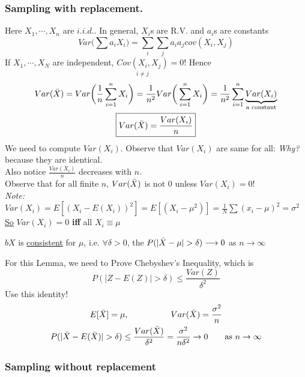 \subsubsection*{Sampling with replacement.}
Here $X_1, \cdots, X_n$ are $i.i.d.$. In general, $X_i$s are R.V. and $a_i$s are constants
\begin{equation*}
	Var\big(\sum a_i X_i\big) = \sum\limits_i \sum\limits_j a_i a_j cov(X_i, X_j) 
\end{equation*}
If $X_1, \cdots, X_N$ are independent, $\underset{i \neq j}{Cov(X_i, X_j)} = 0$! Hence
\begin{gather*}
	Var(\bar{X}) = Var\bigg(\frac{1}{n} \sum\limits_{i=1}^n X_i \bigg) = \frac{1}{n^2} Var\bigg( \sum\limits_{i=1}^n X_i \bigg) = \frac{1}{n^2}  \sum\limits_{i=1}^n \underbrace{Var(X_i)}_{\text{a constant}}\\
	\boxed{Var(\bar{X}) = \frac{Var(X_i)}{n}}
\end{gather*}
We need to compute $Var(X_i)$. Observe that $Var(X_i)$ are same for all: \textit{Why?} because they are identical.\\
Also notice $\frac{Var(X_i)}{n}$ decreases with $n$.\\
Observe that for all finite $n$, $Var(\bar{X})$ is not 0 unless $Var(X_i) = 0$!\\
\emph{Note:} $Var(X_i) = E[(X_i - E(X_i))^2] = E[(X_i - \mu^2)] = \frac{1}{N} \sum (x_i - \mu)^2 = \sigma^2$\\
\underline{So} $Var(X_i) = 0$ \textbf{iff} all $X_i \equiv \mu$
\begin{lemma}
	$bX$ is \underline{consistent} for $\mu$, i.e. $\forall \delta > 0$, the $P(|\bar{X} - \mu| > \delta) \longrightarrow 0$ as $n\rightarrow \infty$
\end{lemma}
For this Lemma, we need to Prove Chebyshev's Inequality, which is
\begin{equation*}
	P(|Z - E(Z)| > \delta) \leq \frac{Var(Z)}{\delta^2}
\end{equation*}
Use this identity!
\begin{gather*}
	E[\bar{X}] = \mu, \hspace{5em} Var(\bar{X}) = \frac{\sigma^2}{n}\\
	P(|\bar{X} - E(\bar{X})| > \delta) \leq \frac{Var(\bar{X})}{\delta^2} = \frac{\sigma^2}{n\delta^2} \rightarrow 0 \qquad \text{as } n \rightarrow \infty
\end{gather*}
\subsubsection*{Sampling without replacement}